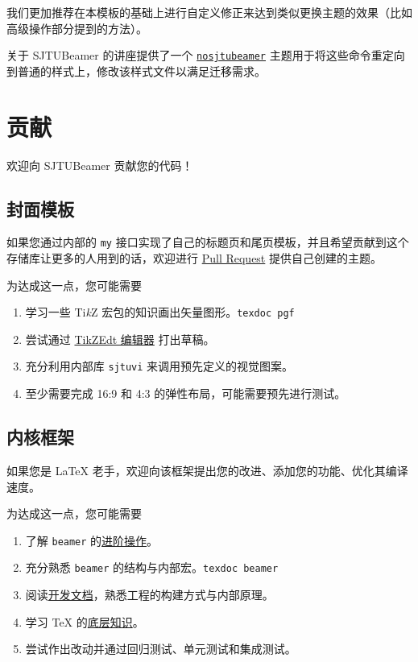 \documentclass[
    UTF8,
    heading=true,
    12pt,
    a4paper
]{ctexrep}
\newcommand{\cls}[1]{\texttt{#1}}
\newcommand{\opt}[1]{\texttt{#1}}
\def\themename{\textsf{SJTUBeamer}}
\begin{document}
我们更加推荐在本模板的基础上进行自定义修正来达到类似更换主题的效果（比如高级操作部分提到的方法）。

关于 \themename{} 的讲座提供了一个 \href{https://github.com/sjtug/sjtulib-latex-talk/blob/logcreative-2022/beamerthemenosjtubeamer.sty}{\cls{nosjtubeamer}} 主题用于将这些命令重定向到普通的样式上，修改该样式文件以满足迁移需求。

\chapter{贡献}

欢迎向 \themename{} 贡献您的代码！

\section{封面模板}

如果您通过内部的 \opt{my} 接口实现了自己的标题页和尾页模板，并且希望贡献到这个存储库让更多的人用到的话，欢迎进行 \href{https://github.com/sjtug/SJTUBeamer/pulls}{Pull Request} 提供自己创建的主题。

为达成这一点，您可能需要
\begin{enumerate}
  \item 学习一些 Ti\textit{k}Z 宏包的知识画出矢量图形。\texttt{texdoc pgf}
  \item 尝试通过 \href{https://code.google.com/archive/p/tikzedt/downloads}{TikZEdt 编辑器} 打出草稿。
  \item 充分利用内部库 \texttt{sjtuvi} 来调用预先定义的视觉图案。
  \item 至少需要完成 16:9 和 4:3 的弹性布局，可能需要预先进行测试。
\end{enumerate}

\section{内核框架}

如果您是 \LaTeX{} 老手，欢迎向该框架提出您的改进、添加您的功能、优化其编译速度。

为达成这一点，您可能需要
\begin{enumerate}
  \item 了解 \texttt{beamer} 的\href{https://latex-beamer.com/}{进阶操作}。
  \item 充分熟悉 \texttt{beamer} 的结构与内部宏。\texttt{texdoc beamer}
  \item 阅读\href{run:sjtubeamerdevguide.pdf}{开发文档}，熟悉工程的构建方式与内部原理。
  \item 学习 \TeX{} 的\href{https://mirrors.sjtug.sjtu.edu.cn/CTAN/graphics/pgf/contrib/pgfplots/doc/TeX-programming-notes.pdf}{底层知识}。
  \item 尝试作出改动并通过回归测试、单元测试和集成测试。
\end{enumerate}
\end{document}
